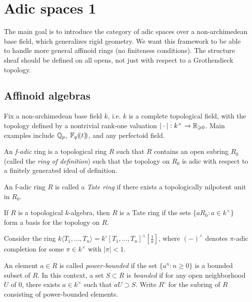 
\section{Adic spaces 1}





The main goal is to introduce the category of adic spaces over a 
non-archimedean base field, which generalizes rigid geometry. We want this 
framework to be able to handle more general affinoid rings (no finiteness 
conditions). The structure sheaf should be defined on all opens, not just 
with respect to a Grothendieck topology. 





\subsection{Affinoid algebras}

Fix a non-archimedean base field $k$, i.e. $k$ is a complete topological field, 
with the topology defined by a nontrivial rank-one valuation 
$|\cdot |:k^\times \to \mathbb{R}_{\geqslant 0}$. Main examples include $\mathbb{Q}_p$, 
$\mathbb{F}_q(\!( {t} )\!)$, and any perfectoid field. 

\begin{definition}
An \emph{f-adic} ring is a topological ring $R$ such that $R$ contains an open 
subring $R_0$ (called the \emph{ring of definition}) such that the topology 
on $R_0$ is adic with respect to a finitely generated ideal of definition. 
\end{definition}

\begin{definition}
An f-adic ring $R$ is called a \emph{Tate ring} if there exists a topologically 
nilpotent unit in $R_0$. 
\end{definition}

If $R$ is a topological $k$-algebra, then $R$ is a Tate ring if the sets 
$\{a R_0:a\in k^\times\}$ form a basis for the topology on $R$. 

\begin{example}
Consider the ring 
$k\langle T_1,\dots,T_n\rangle = k^\circ[T_1,\dots,T_n]^\wedge[\frac 1 \pi]$, 
where $(-)^\wedge$ denotes $\pi$-adic completion for some $\pi\in k^\times$ with 
$|\pi|<1$. 
\end{example}

An element $a\in R$ is called \emph{power-bounded} if the set 
$\{a^n:n\geqslant 0\}$ is a bounded subset of $R$. In this context, a set 
$S\subset R$ is \emph{bounded} if for any open neighborhood $U$ of $0$, there 
exists $a\in k^\times$ such that $a U\supset S$. Write $R^\circ$ for the 
subring of $R$ consisting of power-bounded elements. 

